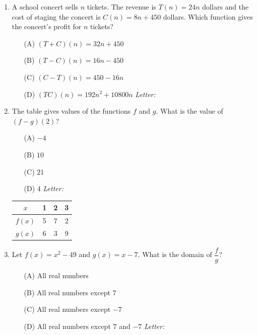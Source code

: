 \documentclass[10pt]{article}
\begin{document}
\begin{enumerate}[leftmargin=1.9em, itemsep=12pt]

\item A school concert sells $n$ tickets. The revenue is $T(n) = 24n$ dollars and the cost of
      staging the concert is $C(n) = 8n + 450$ dollars. Which function gives the concert's
      profit for $n$ tickets?
      \begin{enumerate}[leftmargin=2.6em, itemsep=2pt]
        \item[(A)] $(T + C)(n) = 32n + 450$
        \item[(B)] $(T - C)(n) = 16n - 450$
        \item[(C)] $(C - T)(n) = 450 - 16n$
        \item[(D)] $(TC)(n) = 192n^2 + 10800n$ \hfill\textit{Letter:}~\gradedblank[id=ap1, type=choice, points=1, answer=B]{0.42in}{13pt}
      \end{enumerate}

\item \begin{minipage}[t]{0.52\linewidth}
      The table gives values of the functions $f$ and $g$. What is the value of $(f - g)(2)$?
      \begin{enumerate}[leftmargin=2.6em, itemsep=2pt]
        \item[(A)] $-4$
        \item[(B)] $10$
        \item[(C)] $21$
        \item[(D)] $4$ \hfill\textit{Letter:}~\gradedblank[id=ap2, type=choice, points=1, answer=D]{0.42in}{13pt}
      \end{enumerate}
      \end{minipage}\hfill
      \begin{minipage}[t]{0.42\linewidth}
      \vspace{-2pt}
      \centering
      {\renewcommand{\arraystretch}{1.3}
      \begin{tabular}{|c|c|c|c|}
      \hline
      $x$    & 1 & 2 & 3 \\ \hline
      $f(x)$ & 5 & 7 & 2 \\ \hline
      $g(x)$ & 6 & 3 & 9 \\ \hline
      \end{tabular}}
      \end{minipage}

\item Let $f(x) = x^2 - 49$ and $g(x) = x - 7$. What is the domain of $\dfrac{f}{g}$?
      \begin{enumerate}[leftmargin=2.6em, itemsep=2pt]
        \item[(A)] All real numbers
        \item[(B)] All real numbers except $7$
        \item[(C)] All real numbers except $-7$
        \item[(D)] All real numbers except $7$ and $-7$ \hfill\textit{Letter:}~\gradedblank[id=ap3, type=choice, points=1, answer=B]{0.42in}{13pt}
      \end{enumerate}


\end{enumerate}
\end{document}
